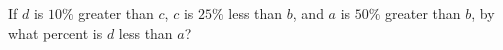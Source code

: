 If $d$ is $10\%$ greater than $c$, $c$ is $25\%$ less than $b$, and $a$ is $50\%$ greater than $b$, by what percent is $d$ less than $a$?

